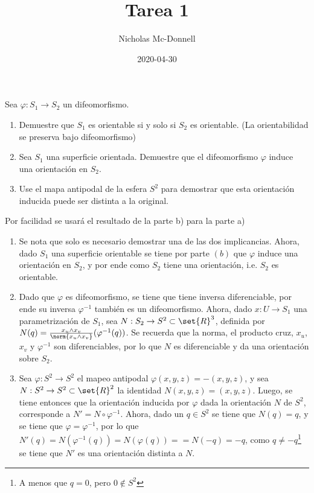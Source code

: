 \documentclass{homework}
\title{Tarea 1}
\date{2020-04-30}
\author{Nicholas Mc-Donnell}
\begin{document}
\maketitle
\newpage
{}


\begin{prob}
    Sea \(\varphi:S_1\rightarrow S_2\) un difeomorfismo.
    \begin{enumerate}
        \item Demuestre que \(S_1\) es orientable si y solo si \(S_2\) es orientable. (La orientabilidad se preserva bajo difeomorfismo)
        \item Sea \(S_1\) una superficie orientada. Demuestre que el difeomorfismo \(\varphi\) induce una orientación en \(S_2\).
        \item Use  el mapa antipodal de la esfera \(S^2\) para demostrar que esta orientación inducida puede ser distinta a la original.
    \end{enumerate}
\end{prob}

\begin{sol}
    Por facilidad se usará el resultado de la parte b) para la parte a)
    \begin{enumerate}
        \item Se nota que solo es necesario demostrar una de las dos implicancias. Ahora, dado \(S_1\) una superficie orientable se tiene por parte \((b)\) que \(\varphi\) induce una orientación en \(S_2\), y por ende como \(S_2\) tiene una orientación, i.e. \(S_2\) es orientable.
        \item Dado que \(\varphi\) es difeomorfismo, se tiene que tiene inversa diferenciable, por ende su inversa \(\varphi^{-1}\) también es un difeomorfismo. Ahora, dado \(x:U\rightarrow S_1\)  una parametrización de \(S_1\), sea \(N:S_2\rightarrow S^2\subset\set{R}^3\), definida por \(N(q)=\frac{x_u\wedge x_v}{\norm{x_u\wedge x_v}}(\varphi^{-1}(q))\). Se recuerda que la norma, el producto cruz, \(x_u\), \(x_v\) y \(\varphi^{-1}\) son diferenciables, por lo que \(N\) es diferenciable y da una orientación sobre \(S_2\).
        \item Sea \(\varphi:S^2\rightarrow S^2\) el mapeo antipodal \(\varphi(x,y,z)=-(x,y,z)\), y sea \(N:S^2\rightarrow S^2\subset\set{R}^2\) la identidad \(N(x,y,z)=(x,y,z)\). Luego, se tiene entonces que la orientación inducida por \(\varphi\) dada la orientación \(N\) de \(S^2\), corresponde a \(N'=N\circ\varphi^{-1}\). Ahora, dado un \(q\in S^2\) se tiene que \(N(q)=q\), y se tiene que \(\varphi=\varphi^{-1}\), por lo que \(N'(q)=N(\varphi^{-1}(q))=N(\varphi(q))==N(-q)=-q\), como \(q\neq -q\)\footnote{A menos que \(q=0\), pero \(0\notin S^2\)} se tiene que \(N'\) es una orientación distinta a \(N\).
    \end{enumerate}
\end{sol}
\end{document}
